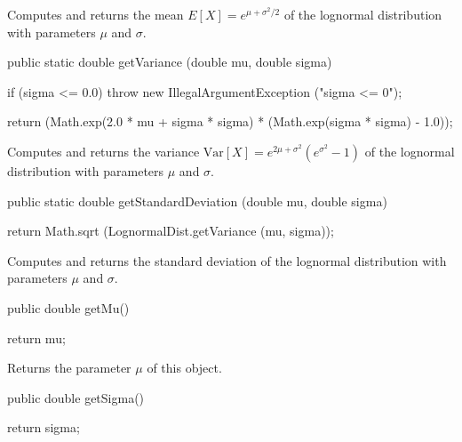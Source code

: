 \begin{tabb}  Computes and returns the mean $E[X] = e^{\mu + \sigma^2/2}$
   of the lognormal distribution with parameters $\mu$ and $\sigma$.
\end{tabb}
\begin{htmlonly}
\end{htmlonly}
\begin{code}

   public static double getVariance (double mu, double sigma)\begin{hide} {
      if (sigma <= 0.0)
         throw new IllegalArgumentException ("sigma <= 0");

      return (Math.exp(2.0 * mu + sigma * sigma) * (Math.exp(sigma * sigma) - 1.0));
   }\end{hide}
\end{code}
\begin{tabb}  Computes and returns the variance
   $\mbox{Var}[X] = e^{2\mu + \sigma^2}(e^{\sigma^2} - 1)$
   of the lognormal distribution with parameters $\mu$ and $\sigma$.
\end{tabb}
\begin{htmlonly}
\end{htmlonly}
\begin{code}

   public static double getStandardDeviation (double mu, double sigma)\begin{hide} {
      return Math.sqrt (LognormalDist.getVariance (mu, sigma));
   }\end{hide}
\end{code}
\begin{tabb}  Computes and returns the standard deviation
   of the lognormal distribution with parameters $\mu$ and $\sigma$.
\end{tabb}
\begin{htmlonly}
\end{htmlonly}
\begin{code}

   public double getMu()\begin{hide} {
      return mu;
   }\end{hide}
\end{code}
  \begin{tabb}  Returns the parameter $\mu$ of this object.
  \end{tabb}
\begin{code}

   public double getSigma()\begin{hide} {
      return sigma;
   }\end{hide}
\end{code}
